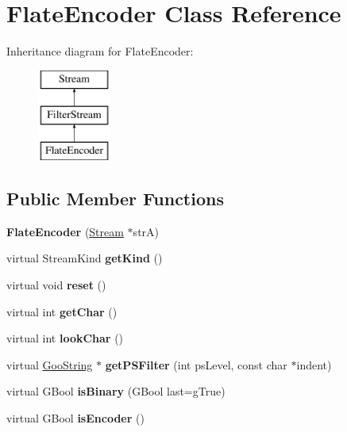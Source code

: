 \hypertarget{class_flate_encoder}{}\section{Flate\+Encoder Class Reference}
\label{class_flate_encoder}
Inheritance diagram for Flate\+Encoder\+:\begin{figure}[H]
\begin{center}
\leavevmode
\includegraphics[height=3.000000cm]{class_flate_encoder}
\end{center}
\end{figure}
\subsection*{Public Member Functions}
\begin{DoxyCompactItemize}
\item 
\mbox{\label{class_flate_encoder_ad1606e447db44f9efde0b3a18367b238}} 
{\bfseries Flate\+Encoder} (\hyperlink{class_stream}{Stream} $\ast$strA)
\item 
\mbox{\label{class_flate_encoder_a0c8dd42c22fed20a0d583a3ed3ca64ea}} 
virtual Stream\+Kind {\bfseries get\+Kind} ()
\item 
\mbox{\label{class_flate_encoder_a0286d66c61d1bea32a2f690026b3ff17}} 
virtual void {\bfseries reset} ()
\item 
\mbox{\label{class_flate_encoder_a02de0655f195d65fd40d237a803b74b8}} 
virtual int {\bfseries get\+Char} ()
\item 
\mbox{\label{class_flate_encoder_ab5ed628219610040e635704d1c88ec7f}} 
virtual int {\bfseries look\+Char} ()
\item 
\mbox{\label{class_flate_encoder_ada400cfecd9623212178ee8388b5b8fb}} 
virtual \hyperlink{class_goo_string}{Goo\+String} $\ast$ {\bfseries get\+P\+S\+Filter} (int ps\+Level, const char $\ast$indent)
\item 
\mbox{\label{class_flate_encoder_a4519137ac22029cafa5a8a6d951cd04c}} 
virtual G\+Bool {\bfseries is\+Binary} (G\+Bool last=g\+True)
\item 
\mbox{\label{class_flate_encoder_a05c48da306e4dbed153a9e36aadca05d}} 
virtual G\+Bool {\bfseries is\+Encoder} ()
\end{DoxyCompactItemize}
